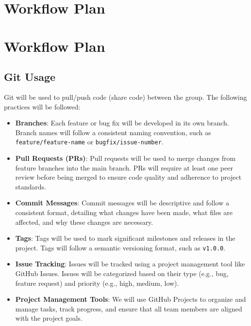 \documentclass{article}
\begin{document}
\section{Workflow Plan}

\section{Workflow Plan}

\subsection{Git Usage}
Git will be used to pull/push code (share code) between the group. The following practices will be followed:
\begin{itemize}
  \item \textbf{Branches}: Each feature or bug fix will be developed in its own branch. Branch names will follow a consistent naming convention, such as \texttt{feature/feature-name} or \texttt{bugfix/issue-number}.
  \item \textbf{Pull Requests (PRs)}: Pull requests will be used to merge changes from feature branches into the main branch. PRs will require at least one peer review before being merged to ensure code quality and adherence to project standards.
  \item \textbf{Commit Messages}: Commit messages will be descriptive and follow a consistent format, detailing what changes have been made, what files are affected, and why these changes are necessary.
  \item \textbf{Tags}: Tags will be used to mark significant milestones and releases in the project. Tags will follow a semantic versioning format, such as \texttt{v1.0.0}.
  \item \textbf{Issue Tracking}: Issues will be tracked using a project management tool like GitHub Issues. Issues will be categorized based on their type (e.g., bug, feature request) and priority (e.g., high, medium, low).
  \item \textbf{Project Management Tools}: We will use GitHub Projects to organize and manage tasks, track progress, and ensure that all team members are aligned with the project goals.
\end{itemize}
\end{document}

